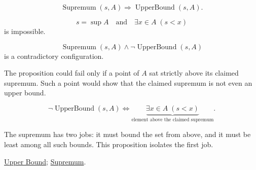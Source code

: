 \begin{remark*}
\[
\operatorname{Supremum}(s,A)
\Longrightarrow
\operatorname{UpperBound}(s,A).
\]
\end{remark*}

\begin{remark*}
\[
s=\sup A
\quad\text{and}\quad
\exists x\in A\;(s<x)
\]
is impossible.
\end{remark*}

\begin{remark*}
\[
\operatorname{Supremum}(s,A)\land \neg\operatorname{UpperBound}(s,A)
\]
is a contradictory configuration.
\end{remark*}

\begin{remark*}
The proposition could fail only if a point of $A$ sat strictly above its claimed supremum. Such a point would show that the claimed supremum is not even an upper bound.
\end{remark*}

\begin{remark*}
\[
\neg\operatorname{UpperBound}(s,A)
\Longleftrightarrow
\underbrace{\exists x\in A\;(s<x)}_{\text{element above the claimed supremum}}.
\]
\end{remark*}

\begin{remark*}[Interpretation]
The supremum has two jobs: it must bound the set from above, and it must be least among all such bounds. This proposition isolates the first job.
\end{remark*}

\begin{dependencies}
\hyperref[def:upper-bound]{Upper Bound};
\hyperref[def:supremum]{Supremum}.
\end{dependencies}































